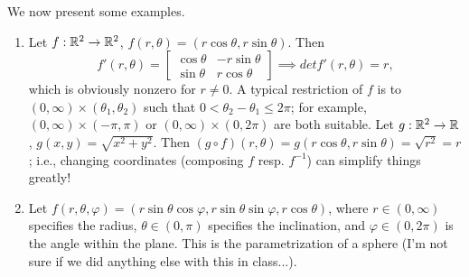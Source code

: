 We now present some examples.
\begin{enumerate}[label=(\alph*)]
    \item Let $f : \mathbb R^2 \to \mathbb R^2$, $f(r, \theta) = (r \cos \theta, r \sin \theta)$. Then
    \[ f'(r, \theta) = \begin{bmatrix} \cos \theta & - r \sin \theta \\ \sin \theta & r \cos \theta \end{bmatrix} \implies det f'(r, \theta) = r, \]
    which is obviously nonzero for $r \neq 0$. A typical restriction of $f$ is to $(0, \infty) \times (\theta_1, \theta_2)$ such that $0 < \theta_2 - \theta_1 \leq 2\pi$; for example, $(0, \infty) \times (-\pi, \pi)$ or $(0, \infty) \times (0, 2\pi)$ are both suitable.
    \medskip\newline
    Let $g : \mathbb R^2 \to \mathbb R$, $g(x, y) = \sqrt{x^2 + y^2}$. Then $(g \circ f)(r, \theta) = g(r \cos \theta, r \sin \theta) = \sqrt{r^2} = r$; i.e., changing coordinates (composing $f$ resp. $f^{-1}$) can simplify things greatly!
    \item Let $f(r, \theta, \varphi) = (r \sin \theta \cos \varphi, r \sin \theta \sin \varphi, r \cos \theta)$, where $r \in (0, \infty)$ specifies the radius, $\theta \in (0, \pi)$ specifies the inclination, and $\varphi \in (0, 2\pi)$ is the angle within the plane. This is the parametrization of a sphere (I'm not sure if we did anything else with this in class...).
\end{enumerate}
